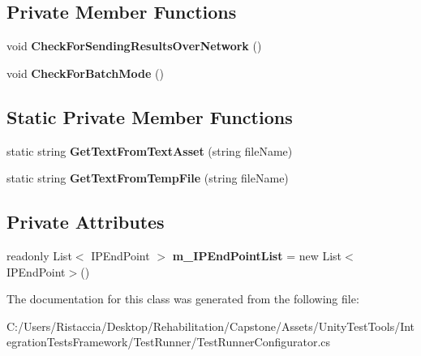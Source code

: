 \subsection*{Private Member Functions}
\begin{DoxyCompactItemize}
\item 
\mbox{\label{class_unity_test_1_1_test_runner_configurator_a9bc84b5239414b68346f3dcb33ddc69d}} 
void {\bfseries Check\+For\+Sending\+Results\+Over\+Network} ()
\item 
\mbox{\label{class_unity_test_1_1_test_runner_configurator_aa5b51e7c9f45a9140f736b75bf6262ac}} 
void {\bfseries Check\+For\+Batch\+Mode} ()
\end{DoxyCompactItemize}
\subsection*{Static Private Member Functions}
\begin{DoxyCompactItemize}
\item 
\mbox{\label{class_unity_test_1_1_test_runner_configurator_a97e355a9b4994e24889de26f5606c29a}} 
static string {\bfseries Get\+Text\+From\+Text\+Asset} (string file\+Name)
\item 
\mbox{\label{class_unity_test_1_1_test_runner_configurator_a0ddd675b47fbb6ca4c6a470df4a22e7a}} 
static string {\bfseries Get\+Text\+From\+Temp\+File} (string file\+Name)
\end{DoxyCompactItemize}
\subsection*{Private Attributes}
\begin{DoxyCompactItemize}
\item 
\mbox{\label{class_unity_test_1_1_test_runner_configurator_af6cc63f81f1641518227390659263e96}} 
readonly List$<$ I\+P\+End\+Point $>$ {\bfseries m\+\_\+\+I\+P\+End\+Point\+List} = new List$<$I\+P\+End\+Point$>$()
\end{DoxyCompactItemize}


The documentation for this class was generated from the following file\+:\begin{DoxyCompactItemize}
\item 
C\+:/\+Users/\+Ristaccia/\+Desktop/\+Rehabilitation/\+Capstone/\+Assets/\+Unity\+Test\+Tools/\+Integration\+Tests\+Framework/\+Test\+Runner/Test\+Runner\+Configurator.\+cs\end{DoxyCompactItemize}

